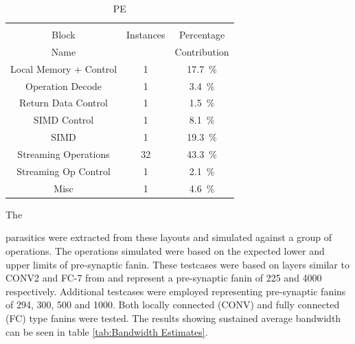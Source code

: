 \documentclass[journal]{IEEEtran}
\begin{document}
\begin{table}[h]
  \bigskip
  \begin{subtable}{0.5\textwidth}
    \centering
    \begin{adjustbox}{width=0.85\textwidth}
      \begin{tabular}{ccc}
        \toprule
                         &          &                                          \\  %
            Block        &Instances & Percentage                               \\  %
            Name         &          & Contribution                             \\  %
        \hline  %
 Local Memory + Control  & 1&\SI[per-mode=symbol]{17.7}{\percent}  \\ 
     Operation Decode    & 1&\SI[per-mode=symbol]{ 3.4}{\percent}  \\
   Return Data Control   & 1&\SI[per-mode=symbol]{ 1.5}{\percent}  \\
    SIMD Control         & 1&\SI[per-mode=symbol]{ 8.1}{\percent}  \\
        SIMD             & 1&\SI[per-mode=symbol]{19.3}{\percent}  \\
  Streaming Operations   &32&\SI[per-mode=symbol]{43.3}{\percent}  \\
  Streaming Op Control   & 1&\SI[per-mode=symbol]{ 2.1}{\percent}  \\
        Misc             & 1&\SI[per-mode=symbol]{ 4.6}{\percent}  \\
        \bottomrule
      \end{tabular}
    \end{adjustbox}
    \vspace{3pt}
    \captionsetup{justification=centering, skip=10pt}
    \caption{PE}
    \label{tab:PE Area Contribution}
  \end{subtable}
  \end{table}


\iffalse
Although the design is yet to close timing, the 
\else
The
\fi
parasitics were extracted from these layouts and simulated against a group of operations. 
The operations simulated were based on the expected lower and upper limits of pre-synaptic fanin. 
These testcases were based on layers similar to CONV2 and FC-7 from \cite{krizhevsky2012imagenet} and represent a pre-synaptic fanin of 225 and 4000 respectively.
Additional testcases were employed representing pre-synaptic fanins of 294, 300, 500 and 1000. Both locally connected (CONV) and fully connected (FC) type fanins were tested.
The results showing sustained average bandwidth can be seen in table \ref{tab:Bandwidth Estimates}.
\end{document}
